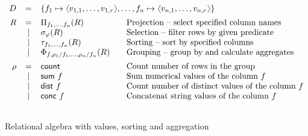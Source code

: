 \documentclass[a4paper,UKenglish]{lipics-v2016}
\theoremstyle{plain}
\theoremstyle{definition}
\newcommand{\vect}[1]{\langl #1 \rangl}
\newcommand{\langl}{\begin{picture}(4.5,7)
\put(1.1,2.5){\rotatebox{60}{\line(1,0){5.5}}}
\put(1.1,2.5){\rotatebox{300}{\line(1,0){5.5}}}
\end{picture}}
\newcommand{\rangl}{\begin{picture}(4.5,7)
\put(.9,2.5){\rotatebox{120}{\line(1,0){5.5}}}
\put(.9,2.5){\rotatebox{240}{\line(1,0){5.5}}}
\end{picture}}
\newcommand{\lsep}{~|~}
\newcommand{\ident}[1]{\textnormal{\sffamily #1}}
\begin{document}
\begin{figure}

\begin{equation*}
\begin{array}{rclll}
  D & = & \multicolumn{3}{l}{ 
    \{f_1\mapsto \vect{v_{1,1},\ldots,v_{1,r}}, \ldots, f_n\mapsto \vect{v_{n,1},\ldots,v_{n,r}}\} 
  }\\[0.5em]
  R & = & \Pi_{f_1, \ldots, f_n} (R) &&\textnormal{Projection -- select specified column names}\\
   & \lsep & \sigma_\varphi (R) &&\textnormal{Selection -- filter rows by given predicate}\\
   & \lsep & \tau_{f_1, \ldots, f_n}(R) &&\textnormal{Sorting -- sort by specified columns}\\
   & \lsep & \Phi_{f, \rho_1/f_1, \ldots, \rho_n/f_n} (R) &&\textnormal{Grouping -- group by and calculate aggregates}
   \\[0.5em]
  \rho & = & \ident{count}  &&\textnormal{Count number of rows in the group}\\
   & \lsep & \ident{sum}~f  &&\textnormal{Sum numerical values of the column $f$}\\
   & \lsep & \ident{dist}~f &&\textnormal{Count number of distinct values of the column $f$}\\
   & \lsep & \ident{conc}~f &&\textnormal{Concatenat string values of the column $f$}\\
\\
\end{array} 
\end{equation*}

\vspace{-1.5em}
\caption{Relational algebra with values, sorting and aggregation}
\label{fig:foo-rel}
\end{figure}

\end{document}
